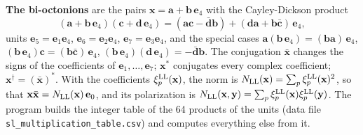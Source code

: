 \documentclass[
  10pt,
]{article}
\begin{document}
\textbf{The bi-octonions} are the pairs
\(\mathbf x=\mathbf a+\mathbf b\,\mathbf e_4\) with the Cayley-Dickson
product
\[(\mathbf a+\mathbf b\,\mathbf e_4)(\mathbf c+\mathbf d\,\mathbf e_4)=(\mathbf a\mathbf c-\bar{\mathbf d}\mathbf b)+(\mathbf d\mathbf a+\mathbf b\bar{\mathbf c})\,\mathbf e_4 ,\]
units \(\mathbf e_5=\mathbf e_1\mathbf e_4\),
\(\mathbf e_6=\mathbf e_2\mathbf e_4\),
\(\mathbf e_7=\mathbf e_3\mathbf e_4\), and the special cases
\(\mathbf a(\mathbf b\,\mathbf e_4)=(\mathbf b\mathbf a)\,\mathbf e_4\),
\((\mathbf b\,\mathbf e_4)\mathbf c=(\mathbf b\bar{\mathbf c})\,\mathbf e_4\),
\((\mathbf b\,\mathbf e_4)(\mathbf d\,\mathbf e_4)=-\bar{\mathbf d}\mathbf b\).
The conjugation \(\bar{\mathbf x}\) changes the signs of the
coefficients of \(\mathbf e_1,\dots,\mathbf e_7\); \(\mathbf x^*\)
conjugates every complex coefficient;
\(\mathbf x^\dagger=(\bar{\mathbf x})^*\). With the coefficients
\(\xi^{\rm LL}_p(\mathbf x)\), the norm is
\(N_{\rm LL}(\mathbf x)=\sum_p\xi^{\rm LL}_p(\mathbf x)^2\), so that
\(\mathbf x\bar{\mathbf x}=N_{\rm LL}(\mathbf x)\,\mathbf e_0\), and its
polarization is
\(N_{\rm LL}(\mathbf x,\mathbf y)=\sum_p\xi^{\rm LL}_p(\mathbf x)\xi^{\rm LL}_p(\mathbf y)\).
The program builds the integer table of the 64 products of the units
(data file \texttt{sl\_multiplication\_table.csv}) and computes
everything else from it.
\end{document}
